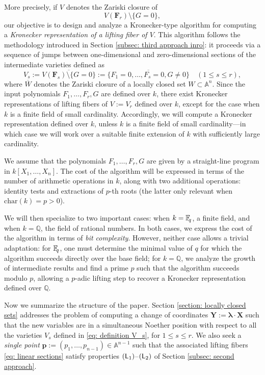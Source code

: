 \documentclass[pdflatex,sn-basic]{sn-jnl}%
\theoremstyle{thmstyleone}%
\theoremstyle{thmstyletwo}%
\theoremstyle{thmstylethree}%
\theoremstyle{definition}
\numberwithin{equation}{section}
\newcommand{\bfs}{\boldsymbol}
\newcommand{\A}{\mathbb A}
\newcommand{\F}{\mathbb F}
\newcommand{\Q}{\mathbb Q}
\newcommand{\fq}{\F_{\hskip-0.7mm q}}
\begin{document}
More precisely, if $V$ denotes the Zariski closure of
%
$$V(\bfs F_r)\setminus\{G=0\},$$
%
our objective is to design and analyze a Kronecker-type algorithm
for computing a {\em Kronecker representation of a lifting fiber of $V$}.
This algorithm follows the methodology introduced in Section \ref{subsec: third
approach inro}: it proceeds via a sequence of jumps between
one-dimensional and zero-dimensional sections of the intermediate
varieties defined as
%
\begin{equation}\label{eq: definition V_s}
V_s:=\overline{V(\bfs F_s)\setminus\{G=0\}}:=\overline{\{F_1=0,\ldots,F_s=0,G\not=0\}}
\quad (1\le s\le r),
\end{equation}
%
where $\overline{W}$ denotes the Zariski closure of a
locally closed set $W\subset\A^n$. Since the input polynomials $F_1,\ldots,F_r,G$ are defined
over $k$, there exist Kronecker representations of
lifting fibers of $V:=V_r$ defined over $k$, except for the case when $k$ is a finite
field of small cardinality. Accordingly, we will compute a
Kronecker representation defined over $k$,
unless $k$ is a finite field of small cardinality---in
which case we will work over a suitable finite extension of $k$ with sufficiently
large cardinality.

We assume that the polynomials $F_1,\ldots,F_r,G$ are given by
a straight-line program in $k[X_1,\ldots,X_n]$. The cost of the
algorithm will be expressed in terms of the number of arithmetic
operations in $k$, along with two additional operations: identity tests and
extractions of $p$-th roots (the latter only relevant when
$\mathrm{char}(k)=p>0$).

We will then specialize to two important cases: when $k=\fq$, a finite field,
and when $k=\Q$, the field of rational
numbers. In both cases, we express the cost of the algorithm
in terms of {\em bit complexity}. However, neither case allows a trivial
adaptation: for $\fq$, one must determine the minimal value of $q$ for
which the algorithm succeeds directly over the base field;
for $k=\Q$, we analyze the growth of intermediate results and
find a prime $p$ such that the algorithm succeeds modulo $p$,
allowing a $p$-adic lifting step to recover a
Kronecker representation defined over $\Q$.

Now we summarize the structure of the paper. Section \ref{section:
locally closed sets} addresses the problem of computing a change of
coordinates $\bfs Y:=\bfs \lambda\cdot \bfs X$ such that the new
variables are in a simultaneous Noether position with respect to all
the varieties $V_s$ defined in \eqref{eq: definition V_s}, for $1\le
s\le r$. We also seek a {\em single point} $\bfs
p:=(p_1,\ldots,p_{n-1}) \in\A^{n-1}$ such that the associated
lifting fibers \eqref{eq: linear sections} satisfy properties $({\sf
L}_1)$--$({\sf L}_2)$ of Section \ref{subsec: second approach}.
\end{document}

